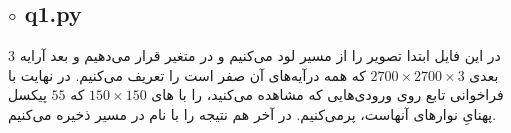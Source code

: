 \documentclass[a4paper,12pt]{article}
\begin{document}
\subsection*{$\circ$ q1.py}
در این فایل ابتدا تصویر 
را از مسیر
لود می‌کنیم و در متغیر 
قرار می‌دهیم و بعد آرایه 3 بعدی $ 2700 \times 2700 \times 3 $
که همه درآیه‌های آن صفر است را تعریف می‌کنیم. در نهایت با فراخوانی تابع 
روی ورودی‌هایی که مشاهده می‌کنید، 
را با 
‌های
$ 150 \times 150 $
که $ 55 $ پیکسل پهنایِ نوارهای 
آنهاست‌، پرمی‌کنیم. در آخر هم نتیجه را با نام 
در مسیر
ذخیره می‌کنیم.	
\end{document}
